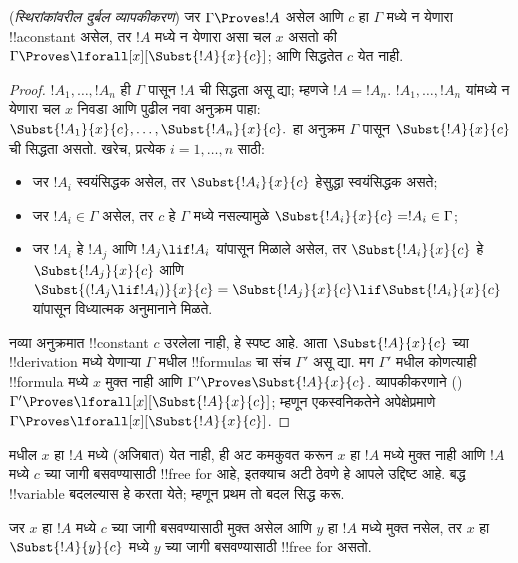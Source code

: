 \documentclass[../../../include/open-logic-section]{subfiles}
\begin{document}
\begin{thm} (\emph{स्थिरांकांवरील दुर्बल व्यापकीकरण})
जर $\Gamma \Proves !A$ असेल आणि $c$ हा $\Gamma$ मध्ये न येणारा
!!a{constant} असेल, तर $!A$ मध्ये न येणारा असा चल $x$ असतो की
$\Gamma \Proves \lforall[x][\Subst{!A}{x}{c}]$; आणि सिद्धतेत $c$ येत नाही.
\end{thm}

\begin{proof} $!A_1,\ldots,!A_n$ ही $\Gamma$ पासून $!A$ ची सिद्धता
असू द्या; म्हणजे $!A=!A_n$. $!A_1,\ldots,!A_n$ यांमध्ये न येणारा चल $x$
निवडा आणि पुढील नवा अनुक्रम पाहा:
$\Subst{!A_1}{x}{c},\ldots,\Subst{!A_n}{x}{c}.$ हा अनुक्रम
$\Gamma$ पासून $\Subst{!A}{x}{c}$ ची सिद्धता असतो. खरेच, प्रत्येक
$i=1,\ldots,n$ साठी: \begin{itemize}
\item जर $!A_i$ स्वयंसिद्धक असेल, तर $\Subst{!A_i}{x}{c}$ हेसुद्धा स्वयंसिद्धक असते;
\item जर $!A_i \in \Gamma$ असेल, तर $c$ हे $\Gamma$ मध्ये नसल्यामुळे
$\Subst{!A_i}{x}{c} = !A_i \in \Gamma$;
\item जर $!A_i$ हे $!A_j$ आणि $!A_j \lif !A_i$ यांपासून मिळाले असेल,
तर $\Subst{!A_i}{x}{c}$ हे $\Subst{!A_j}{x}{c}$ आणि
$\Subst{(!A_j \lif !A_i)}{x}{c}
= \Subst{!A_j}{x}{c} \lif \Subst{!A_i}{x}{c}$ यांपासून विध्यात्मक
अनुमानाने मिळते. \end{itemize}
नव्या अनुक्रमात !!{constant} $c$ उरलेला नाही, हे स्पष्ट आहे. आता
$\Subst{!A}{x}{c}$ च्या !!{derivation} मध्ये येणाऱ्या $\Gamma$ मधील
!!{formula}s चा संच $\Gamma'$ असू द्या. मग $\Gamma'$ मधील कोणत्याही
!!{formula} मध्ये $x$ मुक्त नाही आणि $\Gamma' \Proves \Subst{!A}{x}{c}$.
व्यापकीकरणाने () $\Gamma'
\Proves \lforall[x][\Subst{!A}{x}{c}]$; म्हणून एकस्वनिकतेने
अपेक्षेप्रमाणे $\Gamma \Proves
\lforall[x][\Subst{!A}{x}{c}]$. \end{proof}

\begin{explain}
 मधील $x$ हा $!A$ मध्ये (अजिबात) येत नाही, ही अट
कमकुवत करून $x$ हा $!A$ मध्ये मुक्त नाही आणि $!A$ मध्ये $c$ च्या जागी
बसवण्यासाठी !!{free for} आहे, इतक्याच अटी ठेवणे हे आपले उद्दिष्ट आहे.
बद्ध !!{variable} बदलल्यास हे करता येते; म्हणून प्रथम तो बदल सिद्ध करू.
\end{explain}

\begin{lem}
जर $x$ हा $!A$ मध्ये $c$ च्या जागी बसवण्यासाठी मुक्त असेल आणि $y$
हा $!A$ मध्ये मुक्त नसेल, तर $x$ हा $\Subst{!A}{y}{c}$ मध्ये
$y$ च्या जागी बसवण्यासाठी !!{free for} असतो.
\end{lem}
\end{document}
